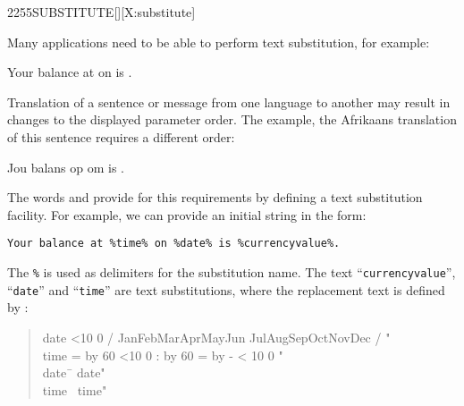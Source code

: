 \begin{worddef}{2255}{SUBSTITUTE}[][X:substitute]
	\begin{rationale}
		Many applications need to be able to perform text substitution, for
		example:

		\begin{center}
			 Your balance at  on  is .
		\end{center}

		Translation of a sentence or message from one language to another may
		result in changes to the displayed parameter order.  The example, the
		Afrikaans translation of this sentence requires a different order:

		\begin{center}
			Jou balans op  om  is .
		\end{center}

		The words  and  provide for this
		requirements by defining a text substitution facility.  For example,
		we can provide an initial string in the form:

		\begin{center}
			\texttt{Your balance at \%time\% on \%date\% is \%currencyvalue\%.}
		\end{center}

		The \texttt{\%} is used as delimiters for the substitution name.  The
		text ``\texttt{currencyvalue}'', ``\texttt{date}'' and ``\texttt{time}''
		are text substitutions, where the replacement text is defined by
		:

\makeatletter
\newcommand{\ptime}{%
	\@tempcnta = \time
	\divide\@tempcnta by 60
	\ifnum\@tempcnta<10 0\fi%
	\number\@tempcnta%
	:%
	\multiply\@tempcnta by 60
	\@tempcntb = \time
	\advance\@tempcntb by -\@tempcnta
	\ifnum\@tempcntb < 10 0\fi%
	\number\@tempcntb
}

\newcommand{\pdate}{%
	\ifnum\day<10 0\fi%
	\number\day%
	/%
	\ifcase\month
	\or Jan\or Feb\or Mar\or Apr\or May\or Jun
	\or Jul\or Aug\or Sep\or Oct\or Nov\or Dec\fi%
	/%
	\number\year
}
\makeatother

		\begin{quote}\ttfamily
			\begin{tabbing}
				\word{:} date  \pdate" \word{;} \\
				\word{:} time  \ptime" \word{;} \\
				date\ \=  date" \word{REPLACES} \\ \>  time" 
			\end{tabbing}
		\end{quote}


\end{rationale}
\end{worddef}
